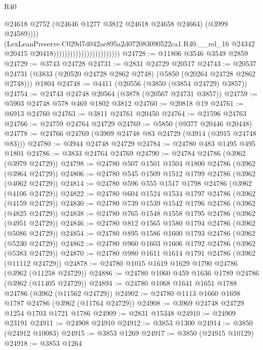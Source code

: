 \begin{lexlean}{R40}
\begin{coremodule}
                                                        @24618
                                                        @2752
                                                        (@24646 @1277 @3812 @24618 @24658 @24664)
                                                        (@3999 @24589))))
                                                  (LexLeanPreserve.C029d7d042ae895a2d072083090522ca1.R40.__rel_16
                                                    @24342
                                                    @20415
                                                    @20418))))))))))))))))))))))))
@24728 := @11806 @3546 @3549 @2859
@24729 := @3743 @24728
@24731 := @2831 @24729 @20517
@24743 := @20537
    @24731
    (@3833 (@20520 @24728 @2862 @2748) (@5850 (@20264 @24728 @2862 @2748)))
    @1804
@24748 := @4411 (@20556 (@3850 (@3854 @24729) @3857))
@24754 := @24743 @24748 @20564 (@3878 (@20567 @24731 @3857))
@24759 := @5903 @24748 @578 @469 @1802 @3812
@24760 := @20818 @19
@24761 := @6913 @24760
@24763 := @3811 @24761 @20450
@24764 := @21596 @24763
@24766 := @24759 @24764 @24729
@24769 := @5850 (@9377 @20446 @20448)
@24778 := @24766 @24769 (@3909 @24748 @83 @24729 (@3914 (@3915 @24748 @83)))
@24780 := @3944 @24748 @24729
@24784 := @24780 @483 @1495 @495 @1801
@24786 := @3833 @24764 @24769
@24790 := @24784 @24786 (@3962 (@3979 @24729))
@24798 := @24780 @507 @1501 @1504 @1800 @24786 (@3962 (@3964 @24729))
@24806 := @24780 @545 @1509 @1512 @1799 @24786 (@3962 (@4062 @24729))
@24814 := @24780 @596 @555 @1517 @1798 @24786 (@3962 (@4106 @24729))
@24822 := @24780 @604 @1524 @1534 @1797 @24786 (@3962 (@4159 @24729))
@24830 := @24780 @739 @1539 @1542 @1796 @24786 (@3962 (@4825 @24729))
@24838 := @24780 @765 @1548 @1558 @1795 @24786 (@3962 (@4951 @24729))
@24846 := @24780 @812 @1565 @1580 @1794 @24786 (@3962 (@5086 @24729))
@24854 := @24780 @895 @1586 @1600 @1793 @24786 (@3962 (@5230 @24729))
@24862 := @24780 @960 @1603 @1606 @1792 @24786 (@3962 (@5383 @24729))
@24870 := @24780 @980 @1611 @1614 @1791 @24786 (@3962 (@11112 @24729))
@24878 := @24780 @1015 @1619 @1629 @1790 @24786 (@3962 (@11258 @24729))
@24886 := @24780 @1060 @459 @1636 @1789 @24786 (@3962 (@11405 @24729))
@24894 := @24780 @1068 @1641 @1651 @1788 @24786 (@3962 (@11562 @24729))
@24902 := @24780 @1113 @1660 @1698 @1787 @24786 (@3962 (@11764 @24729))
@24908 := @3969 @24748 @24729 @1254 @1703 @1721 @1786
@24909 := @2831 @15348
@24910 := @24909 @23191
@24911 := @24908 @24910
@24912 := @3853 @1300
@24914 := @3850 (@24912 @10083)
@24915 := @3853 @1269
@24917 := @3850 (@24915 @10129)
@24918 := @3853 @1264

\end{coremodule}
\end{lexlean}
